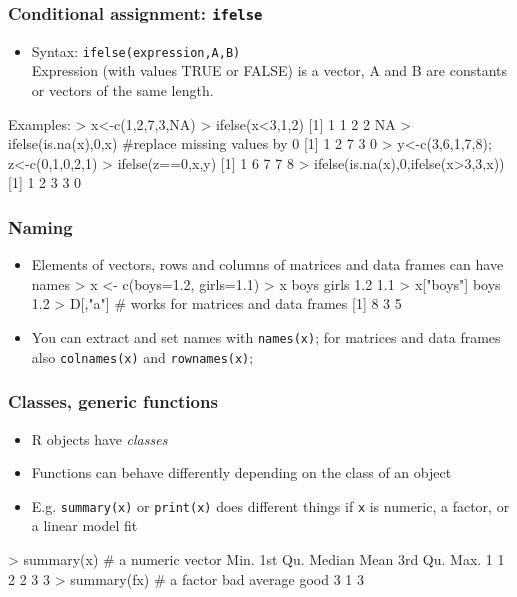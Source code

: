 \documentclass{beamer}
\newcommand{\code}[1]{\texttt{#1}}
\let\overbatim\verbatim
\let\endoverbatim\endverbatim
\newenvironment{vcode}%
{\bgroup\baselineskip=0.8\baselineskip\overbatim}%
{\endoverbatim\egroup}
\newcounter{demo}
\newcommand{\Demo}{\stepcounter{demo}\frametitle{Demo \arabic{demo}}}
\begin{document}
\begin{frame}[fragile]
  \frametitle{Conditional assignment: \texttt{ifelse}}
  \begin{itemize}
  \item Syntax: \code{ifelse(expression,A,B)} \\
Expression (with values TRUE or FALSE) is a vector, A and B are constants or vectors of the same length.
 \end{itemize}
Examples: %
\begin{vcode}
> x<-c(1,2,7,3,NA)
> ifelse(x<3,1,2)
[1]  1  1  2  2 NA
> ifelse(is.na(x),0,x) #replace missing values by 0 
[1] 1 2 7 3 0
>  y<-c(3,6,1,7,8);  z<-c(0,1,0,2,1)
>  ifelse(z==0,x,y)
[1] 1 6 7 7 8
>  ifelse(is.na(x),0,ifelse(x>3,3,x)) 
[1] 1 2 3 3 0
\end{vcode}
\end{frame}

\begin{frame}[fragile]
  \frametitle{Naming}
  \begin{itemize}
  \item Elements of vectors, rows and columns of matrices and data frames can have names
\begin{vcode}
> x <- c(boys=1.2, girls=1.1)
> x
 boys girls 
  1.2   1.1 
> x["boys"]
boys 
 1.2
> D[,"a"]  # works for matrices and data frames
[1] 8 3 5
\end{vcode}
  \item You can extract and set names with \code{names(x)}; for matrices and data frames also \code{colnames(x)} and \code{rownames(x)};
 \end{itemize}
\end{frame}


\begin{frame}[fragile]
  \frametitle{Classes, generic functions}
  \begin{itemize}
  \item R objects have \emph{classes} 
  \item Functions can behave differently depending on the class of an
    object 
  \item E.g. \code{summary(x)} or \code{print(x)} does different
    things if \code{x} is numeric, a factor, or a linear model fit
  \end{itemize}
\begin{vcode}
  > summary(x)  # a numeric vector
   Min. 1st Qu.  Median    Mean 3rd Qu.    Max. 
      1       1       2       2       3       3 
> summary(fx) # a factor
    bad average    good 
      3       1       3 
\end{vcode}
\end{frame}
\end{document}
